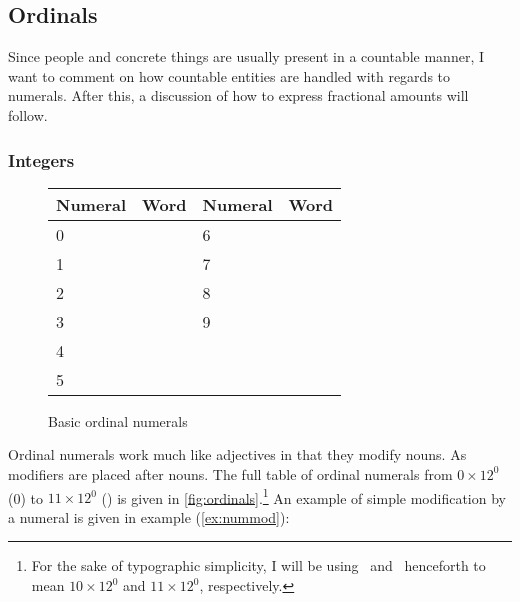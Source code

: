 \subsection{Ordinals}

Since people and concrete things are usually present in a countable manner, I 
want to comment on how countable entities are handled with regards to numerals. 
After this, a discussion of how to express fractional amounts will follow.

\subsubsection{Integers}

\begin{figure}[tp]\centering
\caption{Basic ordinal numerals}
\begin{tabu} to .75\linewidth {X[c] X[c] X[c] X[c]}
\toprule\tableheaderfont
Numeral
	& Word
				& Numeral
					& Word
	\\
\toprule

0
	& 
				& 6
					& 
	\\

1
	& 
				& 7
					& 
	\\
	
2
	& 
				& 8
					& 
	\\
	
3
	& 
				& 9
					& 
	\\

4
	& 
				& \ten
					& 
	\\

5
	& 
				& \elv
					& 
	\\

\bottomrule
\end{tabu}
\label{fig:ordinals}
\end{figure}

Ordinal numerals work much like adjectives in that they modify nouns. As 
modifiers are placed after nouns. The full table of ordinal numerals from $0 
\times 12^0$ (0) to $11 \times 12^0$ (\elv) is given in 
\autoref{fig:ordinals}.\footnote{For the sake of typographic simplicity, I will 
be using \ten\ and \elv\ henceforth to mean $10 \times 12^0$ and $11 \times 
12^0$, respectively.} An example of simple modification by a numeral is given 
in example (\ref{ex:nummod}):

